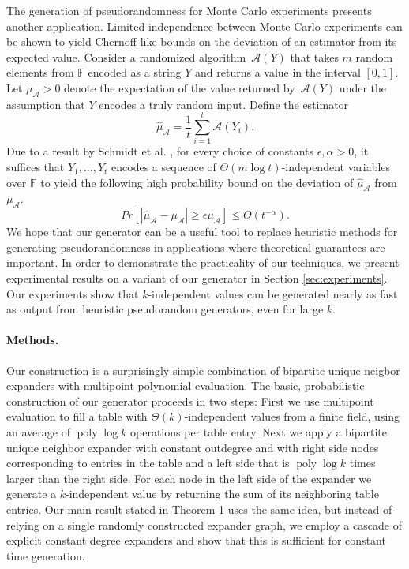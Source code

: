 \documentclass[a4paper,11pt]{article}
\theoremstyle{plain}
\theoremstyle{definition}
\newcommand{\F}{\mathbb{F}}
\newcommand{\A}{\mathcal{A}}
\DeclareMathOperator{\poly}{poly}
\begin{document}
The generation of pseudorandomness for Monte Carlo experiments presents another application.
Limited independence between Monte Carlo experiments can be shown to yield Chernoff-like bounds on the deviation of an estimator from its expected value. 
Consider a randomized algorithm~$\A(Y)$ that takes $m$ random elements from $\F$ encoded as a string $Y$ and returns a value in the interval $[0,1]$.    
Let $\mu_{\A} > 0$ denote the expectation of the value returned by~$\A(Y)$ under the assumption that $Y$ encodes a truly random input.
Define the estimator
\begin{equation}
\hat{\mu}_{\A} = \frac{1}{t}\sum_{i=1}^{t}\A(Y_{i}).
\end{equation}
Due to a result by Schmidt et al. \cite[Theorem 5]{schmidt1995}, for every choice of constants $\epsilon, \alpha > 0$,
it suffices that $Y_{1}, \dots, Y_{t}$ encodes a sequence of $\Theta(m \log t)$-independent variables over $\F$ to yield the following high probability bound on the deviation of $\hat{\mu}_{\A}$ from $\mu_{\A}$.
\begin{equation}
Pr[|\hat{\mu}_{\A} - \mu_{\A}| \geq \epsilon\mu_{\A}] \leq O(t^{-\alpha}). 
\end{equation}
We hope that our generator can be a useful tool to replace heuristic methods for generating pseudorandomness in applications where theoretical guarantees are important. 
In order to demonstrate the practicality of our techniques, we present experimental results on a variant of our generator in Section \ref{sec:experiments}. 
Our experiments show that $k$-independent values can be generated nearly as fast as output from heuristic pseudorandom generators, even for large $k$.

\paragraph{Methods.}
Our construction is a surprisingly simple combination of bipartite unique neigbor expanders with multipoint polynomial evaluation.
The basic, probabilistic construction of our generator proceeds in two steps: 
First we use multipoint evaluation to fill a table with \mbox{$\Theta(k)$-independent} values from a finite field, using an average of $\poly \log k$ operations per table entry.
Next we apply a bipartite unique neighbor expander with constant outdegree and with right side nodes corresponding to entries in the table and a left side that is $\poly \log k$ times larger than the right side.
For each node in the left side of the expander we generate a $k$-independent value by returning the sum of its neighboring table entries.
Our main result stated in Theorem 1 uses the same idea, but instead of relying on a single randomly constructed expander graph, 
we employ a cascade of explicit constant degree expanders and show that this is sufficient for constant time generation.   
\end{document}
